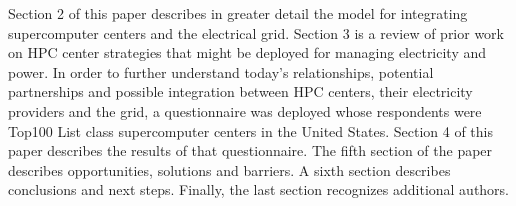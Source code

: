 
Section 2 of this paper describes in greater detail the model for
integrating supercomputer centers and the electrical grid. Section 3 
is a review of prior work on HPC center strategies that might be
deployed for managing electricity and power. In order to further understand
today's relationships, potential partnerships and possible integration
between HPC centers, their electricity providers and the grid, a
questionnaire was deployed whose respondents were Top100 List class
supercomputer centers in the United States. Section 4 of this paper
describes the results of that questionnaire. The fifth section of the paper
describes opportunities, solutions and barriers. A sixth section describes
conclusions and next steps. Finally, the last section recognizes additional
authors.

